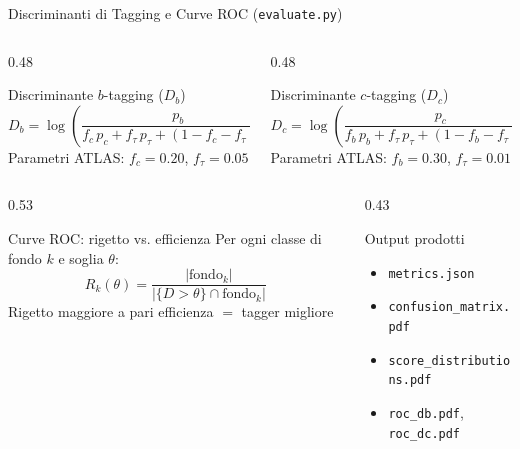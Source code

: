 \documentclass[aspectratio=169, 10pt]{beamer}
\begin{document}
\begin{frame}{Discriminanti di Tagging e Curve ROC (\texttt{evaluate.py})}
    \begin{columns}[T]
        \begin{column}{0.48\textwidth}
            \begin{block}{Discriminante $b$-tagging ($D_b$)}
                \[
                    D_b = \log\!\left(\frac{p_b}{f_c\,p_c + f_\tau\,p_\tau
                    + (1{-}f_c{-}f_\tau)\,p_u}\right)
                \]
                Parametri ATLAS: $f_c = 0.20$, $f_\tau = 0.05$
            \end{block}
        \end{column}
        \begin{column}{0.48\textwidth}
            \begin{block}{Discriminante $c$-tagging ($D_c$)}
                \[
                    D_c = \log\!\left(\frac{p_c}{f_b\,p_b + f_\tau\,p_\tau
                    + (1{-}f_b{-}f_\tau)\,p_u}\right)
                \]
                Parametri ATLAS: $f_b = 0.30$, $f_\tau = 0.01$
            \end{block}
        \end{column}
    \end{columns}
    \vspace{0.5cm}
    \begin{columns}[T]
        \begin{column}{0.53\textwidth}
            \begin{block}{Curve ROC: rigetto vs. efficienza}
                Per ogni classe di fondo $k$ e soglia $\theta$:
                \[
                    R_k(\theta) =
                    \frac{|\text{fondo}_k|}{|\{D>\theta\}\cap\text{fondo}_k|}
                \]
                Rigetto maggiore a pari efficienza $=$ tagger migliore
            \end{block}
        \end{column}
        \begin{column}{0.43\textwidth}
            \begin{block}{Output prodotti}
                \begin{itemize}
                    \item \texttt{metrics.json}
                    \item \texttt{confusion\_matrix.pdf}
                    \item \texttt{score\_distributions.pdf}
                    \item \texttt{roc\_db.pdf}, \texttt{roc\_dc.pdf}
                \end{itemize}
            \end{block}
        \end{column}
    \end{columns}
\end{frame}
\end{document}
